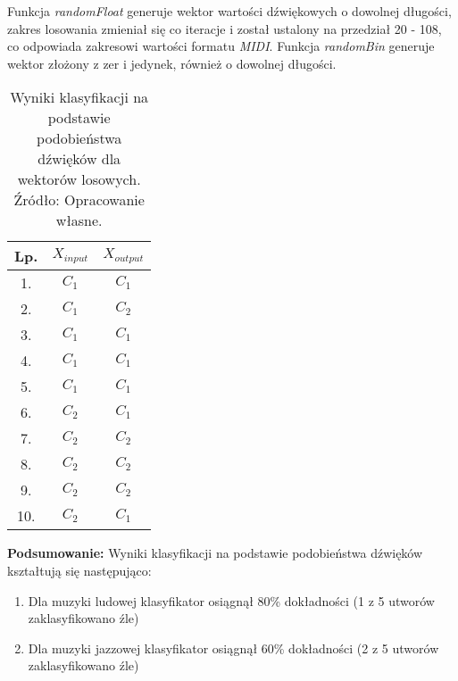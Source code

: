 Funkcja \textit{randomFloat} generuje wektor wartości dźwiękowych o dowolnej długości, zakres losowania zmieniał się co iteracje i został ustalony na przedział 20 - 108, co odpowiada zakresowi wartości formatu \textit{MIDI}. Funkcja \textit{randomBin} generuje wektor złożony z zer i jedynek, również o dowolnej długości.
\FloatBarrier
\begin{table}[h]
\begin{tabular}{|c|c|c|}
\hline
Lp. & $X_{input}$ & $X_{output}$ \\ \hline
1.   & $C_{1}$      & $C_{1}$      \\ \hline
2.   & $C_{1}$      & $C_{2}$     \\ \hline
3.   & $C_{1}$      & $C_{1}$      \\ \hline
4.   & $C_{1}$      & $C_{1}$     \\ \hline
5.   & $C_{1}$      & $C_{1}$      \\ \hline
6.   & $C_{2}$      & $C_{1}$    \\ \hline
7.   & $C_{2}$      & $C_{2}$     \\ \hline
8.   & $C_{2}$      & $C_{2}$     \\ \hline
9.   & $C_{2}$      & $C_{2}$     \\ \hline
10.  & $C_{2}$      & $C_{1}$      \\ \hline
\end{tabular}
\centering
\caption{Wyniki klasyfikacji na podstawie podobieństwa dźwięków dla wektorów losowych. Źródło: Opracowanie własne.}
\end{table}
\FloatBarrier

\textbf{Podsumowanie:}
Wyniki klasyfikacji na podstawie podobieństwa dźwięków kształtują się następująco:

\begin{enumerate}
    \item Dla muzyki ludowej klasyfikator osiągnął 80\% dokładności (1 z 5 utworów zaklasyfikowano źle)
    \item Dla muzyki jazzowej klasyfikator osiągnął 60\% dokładności (2 z 5 utworów zaklasyfikowano źle)
\end{enumerate}

